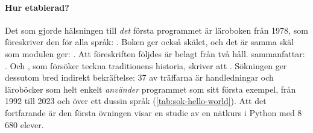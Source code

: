 \paragraph{Hur etablerad?}  Det som gjorde hälsningen till \emph{det}
första programmet är läroboken från 1978, som föreskriver den för alla
språk: .  Boken ger
också skälet, och det är samma skäl som modulen ger:
.
Att föreskriften följdes är belagt från två håll.  \Textcite{Sack2025Hello}
sammanfattar: .  Och \textcite{Mount2008Hello}, som
försöker teckna traditionens historia, skriver att
.  Sökningen ger dessutom bred indirekt bekräftelse: 37 av
träffarna är handledningar och läroböcker som helt enkelt \emph{använder}
programmet som sitt första exempel, från 1992 till 2023 och över ett
dussin språk (\cref{tab:sok-hello-world}).  Att det fortfarande är den
första övningen visar en studie av en nätkurs i Python med 8\,680
elever\autocite{Jeffries2022Hello}.

